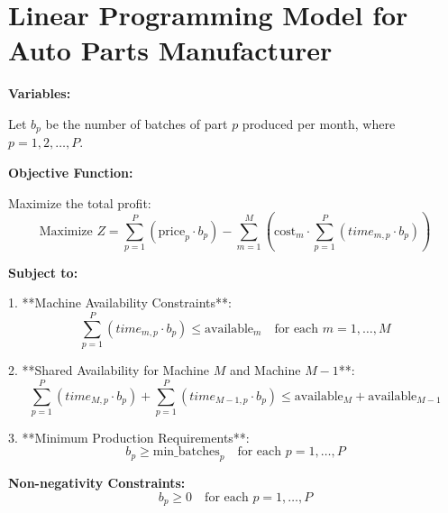\documentclass{article}
\begin{document}
\section*{Linear Programming Model for Auto Parts Manufacturer}

\textbf{Variables:}

Let \( b_p \) be the number of batches of part \( p \) produced per month, where \( p = 1, 2, \ldots, P \).

\textbf{Objective Function:}

Maximize the total profit:
\[
\text{Maximize } Z = \sum_{p=1}^{P} \left( \text{price}_p \cdot b_p \right) - \sum_{m=1}^{M} \left( \text{cost}_m \cdot \sum_{p=1}^{P} (time_{m,p} \cdot b_p) \right)
\]

\textbf{Subject to:}

1. **Machine Availability Constraints**:
   \[
   \sum_{p=1}^{P} (time_{m,p} \cdot b_p) \leq \text{available}_m \quad \text{for each } m = 1, \ldots, M
   \]

2. **Shared Availability for Machine \( M \) and Machine \( M-1 \)**:
   \[
   \sum_{p=1}^{P} (time_{M,p} \cdot b_p) + \sum_{p=1}^{P} (time_{M-1,p} \cdot b_p) \leq \text{available}_{M} + \text{available}_{M-1}
   \]

3. **Minimum Production Requirements**:
   \[
   b_p \geq \text{min\_batches}_p \quad \text{for each } p = 1, \ldots, P
   \]

\textbf{Non-negativity Constraints:}
\[
b_p \geq 0 \quad \text{for each } p = 1, \ldots, P
\]
\end{document}
